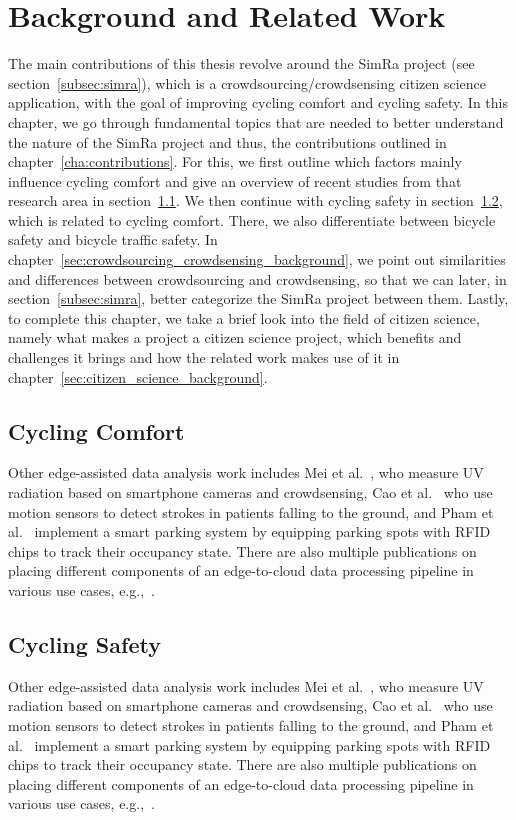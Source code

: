 \cleardoublepage
\chapter{Background and Related Work}
\label{cha:background}
The main contributions of this thesis revolve around the SimRa project (see section~\ref{subsec:simra}), which is a crowdsourcing/crowdsensing citizen science application, with the goal of improving cycling comfort and cycling safety.
In this chapter, we go through fundamental topics that are needed to better understand the nature of the SimRa project and thus, the contributions outlined in chapter~\ref{cha:contributions}.
For this, we first outline which factors mainly influence cycling comfort and give an overview of recent studies from that research area in section~\ref{sec:cycling_comfort_background}.
We then continue with cycling safety in section~\ref{sec:cycling_safety_background}, which is related to cycling comfort.
There, we also differentiate between bicycle safety and bicycle traffic safety.
In chapter~\ref{sec:crowdsourcing_crowdsensing_background}, we point out similarities and differences between crowdsourcing and crowdsensing, so that we can later, in section~\ref{subsec:simra}, better categorize the SimRa project between them.
Lastly, to complete this chapter, we take a brief look into the field of citizen science, namely what makes a project a citizen science project, which benefits and challenges it brings and how the related work makes use of it in chapter~\ref{sec:citizen_science_background}. 

\section{Cycling Comfort}
\label{sec:cycling_comfort_background}
Other edge-assisted data analysis work includes Mei et al.~\cite{mei2017ultraviolet}, who measure UV radiation based on smartphone cameras and crowdsensing,
Cao et al.~\cite{cao2015fast} who use motion sensors to detect strokes in patients falling to the ground, and
Pham et al.~\cite{pham2015a} implement a smart parking system by equipping parking spots with RFID chips to track their occupancy state.
There are also multiple publications on placing different components of an edge-to-cloud data processing pipeline in various use cases, e.g.,~\cite{lujic2021increasing,pfandzelter2021zero,hattab2019optimized}.


\section{Cycling Safety}
\label{sec:cycling_safety_background}
Other edge-assisted data analysis work includes Mei et al.~\cite{mei2017ultraviolet}, who measure UV radiation based on smartphone cameras and crowdsensing,
Cao et al.~\cite{cao2015fast} who use motion sensors to detect strokes in patients falling to the ground, and
Pham et al.~\cite{pham2015a} implement a smart parking system by equipping parking spots with RFID chips to track their occupancy state.
There are also multiple publications on placing different components of an edge-to-cloud data processing pipeline in various use cases, e.g.,~\cite{lujic2021increasing,pfandzelter2021zero,hattab2019optimized}.



